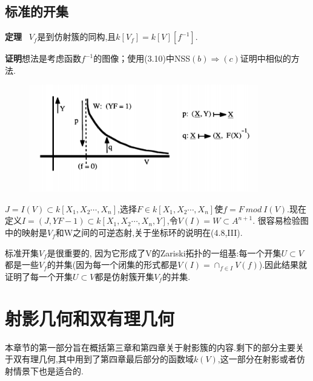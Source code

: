 \documentclass[UTF8]{book}
\begin{document}
	\section{标准的开集}


		\textbf{定理} \ $V_{f}$是到仿射簇的同构,且$k[V_{f}]=k[V][f^{-1}].$

		\textbf{证明}想法是考虑函数$f^{-1}$的图像；使用(3.10)中NSS$(b)\Rightarrow(c)$证明中相似的方法.
		\begin{figure}[h]
		  \centering
		  \includegraphics[width=10cm]{75.jpg}\\
		\end{figure}

		$J=I(V)\subset k[X_{1},X_{2}\cdots,X_{n}]$,选择$F\in k[X_{1},X_{2}\cdots,X_{n}]$使$f=F \ mod \ I(V)$.现在定义$I=(J,YF-1)\subset k[X_{1},X_{2}\cdots,X_{n},Y]$,令$V(I)=W\subset A^{n+1}.$
		很容易检验图中的映射是$V_{f}$和W之间的可逆态射,关于坐标环的说明在(4.8,III).

		标准开集$V_{f}$是很重要的, 因为它形成了V的Zariski拓扑的一组基:每一个开集$U\subset V$都是一些$V_{f}$的并集(因为每一个闭集的形式都是$V(I)=\cap_{f \in I} V(f)$).因此结果就证明了每一个开集$U\subset V$都是仿射簇开集$V_{f}$的并集.



\chapter{射影几何和双有理几何}
	本章节的第一部分旨在概括第三章和第四章关于射影簇的内容.剩下的部分主要关于双有理几何,其中用到了第四章最后部分的函数域$ k(V) $,这一部分在射影或者仿射情景下也是适合的.
	
	\setcounter{section}{-1}
\end{document}
